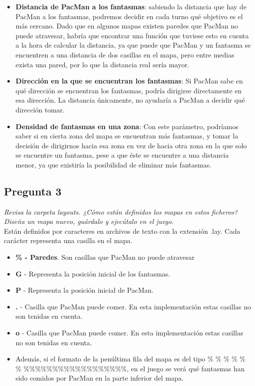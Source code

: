 \documentclass[12pt]{article}
\begin{document}
\begin{itemize}
    \item \textbf{Distancia de PacMan a los fantasmas}: sabiendo la distancia
    que hay de PacMan a los fantasmas, podremos decidir en cada turno qué
    objetivo es el más cercano. Dado que en algunos mapas existen paredes que
    PacMan no puede atravesar, habría que encontrar una función que tuviese
    esto en cuenta a la hora de calcular la distancia, ya que puede que PacMan
    y un fantasma se encuentren a una distancia de dos casillas en el mapa,
    pero entre medias exista una pared, por lo que la distancia real sería mayor.
    \item \textbf{Dirección en la que se encuentran los fantasmas}: Si PacMan
    sabe en qué dirección se encuentran los fantasmas, podría dirigirse
    directamente en esa dirección. La distancia únicamente, no ayudaría a
    PacMan a decidir qué dirección tomar.
    \item \textbf{Densidad de fantasmas en una zona}: Con este parámetro,
    podríamos saber si en cierta zona del mapa se encuentran más fantasmas, y
    tomar la decisión de dirigirnos hacia esa zona en vez de hacia otra zona en
    la que solo se encuentre un fantasma, pese a que éste se encuentre a una
    distancia menor, ya que existiría la posibilidad de eliminar más fantasmas.
\end{itemize}

\subsection{Pregunta 3}

\emph{Revisa la carpeta layouts. ¿Cómo están definidos los mapas en estos
ficheros? Diseña un mapa nuevo, guárdalo y ejecútalo en el juego.}\\

Están definidos por caracteres en archivos de texto con la extensión .lay.
 Cada carácter representa una casilla en el mapa.\\

\begin{itemize}
    \item \textbf{\% - Paredes}. Son casillas que PacMan no puede atravesar
    \item \textbf{G} - Representa la posición inicial de los fantasmas.
    \item \textbf{P} - Representa la posición inicial de PacMan.
    \item \textbf{.} - Casilla que PacMan puede comer. En esta implementación
    estas casillas no son tenidas en cuenta.
    \item \textbf{o} - Casilla que PacMan puede comer. En esta implementación
    estas casillas no son tenidas en cuenta.
    \item Además, si el formato de la penúltima fila del mapa es del tipo \% \%
    \% \% \% \% \%\%\%\%\%\%\%\%\%\%\%\%\%\%\%\%\%\%, en el juego se verá qué
    fantasmas han sido comidos por PacMan en la parte inferior del mapa.
\end{itemize}
\end{document}
